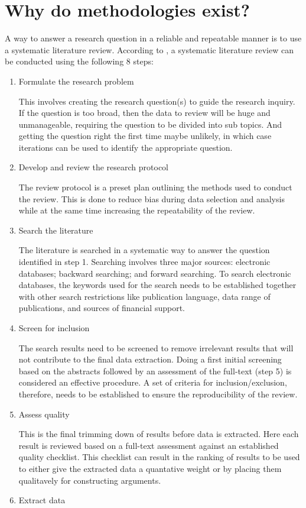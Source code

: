 \section{Why do methodologies exist?}
\label{sec:meth_why}
A way to answer a research question in a reliable and repeatable manner is to use a systematic literature review.
According to \cite{xiao_2017}, a systematic literature review can be conducted using the following 8 steps:
\begin{enumerate}
    \item Formulate the research problem

      This involves creating the research question(s) to guide the research inquiry.
      If the question is too broad, then the data to review will be huge and unmanageable, requiring the question to be divided into sub topics.
      And getting the question right the first time maybe unlikely, in which case iterations can be used to identify the appropriate question.
    \item Develop and review the research protocol

      The review protocol is a preset plan outlining the methods used to conduct the review.
      This is done to reduce bias during data selection and analysis while at the same time increasing the repeatability of the review.
    \item Search the literature

      The literature is searched in a systematic way to answer the question identified in step 1.
      Searching involves three major sources: electronic databases; backward searching; and forward searching.
      To search electronic databases, the keywords used for the search needs to be established together with other search restrictions like publication language, data range of publications, and sources of financial support.
    \item Screen for inclusion

      The search results need to be screened to remove irrelevant results that will not contribute to the final data extraction.
      Doing a first initial screening based on the abstracts followed by an assessment of the full-text (step 5) is considered an effective procedure.
      A set of criteria for inclusion/exclusion, therefore, needs to be established to ensure the reproducibility of the review.
    \item Assess quality

      This is the final trimming down of results before data is extracted.
      Here each result is reviewed based on a full-text assessment against an established quality checklist.
      This checklist can result in the ranking of results to be used to either give the extracted data a quantative weight or by placing them qualitavely for constructing arguments.
    \item Extract data


\end{enumerate}
